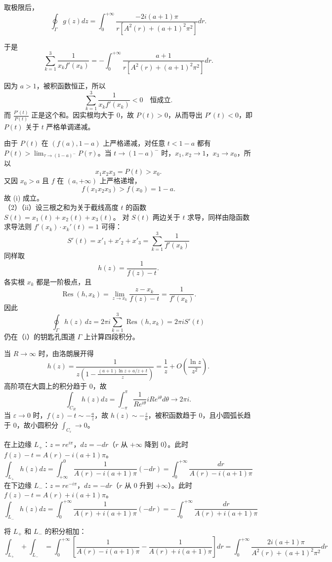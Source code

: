 \begin{solution}
取极限后，
$$\oint_\Gamma g(z)dz = \int_0^{+\infty}\frac{-2i(a+1)\pi}{r\left[A^2(r)+(a+1)^2\pi^2\right]}dr.$$

于是
$$\sum_{k=1}^3\frac{1}{x_k f'(x_k)} = -\int_0^{+\infty}\frac{a+1}{r\left[A^2(r)+(a+1)^2\pi^2\right]}dr.$$

因为 $a>1$，被积函数恒正，所以
$$\sum_{k=1}^3\frac{1}{x_k f'(x_k)} < 0 \quad \text{恒成立}.$$
而 $\frac{P'(t)}{P(t)}$ 正是这个和。因实根均大于 0，故 $P(t)>0$，从而导出 $P'(t)<0$，即 $P(t)$ 关于 $t$ 严格单调递减。

由于 $P(t)$ 在 $(f(a),1-a)$ 上严格递减，对任意 $t<1-a$ 都有 $P(t) > \lim_{\tau\to(1-a)^-}P(\tau)$。当 $t\to(1-a)^-$ 时，$x_1,x_2\to1$，$x_3\to x_0$，所以
$$x_1x_2x_3 = P(t) > x_0.$$
又因 $x_0>a$ 且 $f$ 在 $(a,+\infty)$ 上严格递增，
$$f(x_1x_2x_3) > f(x_0) = 1-a.$$
故 (i) 成立。\\
（2）（ii）设三根之和为关于截线高度 $t$ 的函数 $S(t)=x_1(t)+x_2(t)+x_3(t)$。
对 $S(t)$ 两边关于 $t$ 求导，同样由隐函数求导法则 $f'(x_k)\cdot x_k'(t)=1$ 可得：
$$S'(t)=x'_1+x'_2+x'_3=\sum_{k=1}^3\frac{1}{f'(x_k)}$$
同样取
$$ h(z)=\dfrac{1}{f(z)-t}. $$
各实根 $x_k$ 都是一阶极点，且
$$ \operatorname{Res}(h,x_k)=\lim_{z\to x_k}\frac{z-x_k}{f(z)-t}=\frac{1}{f'(x_k)}. $$
因此
$$\oint_\Gamma h(z)\,dz = 2\pi i \sum_{k=1}^3 \operatorname{Res}(h,x_k)=2\pi i S'(t)$$
仍在（i）的钥匙孔围道 $\Gamma$ 上计算四段积分。

当 $R\to\infty$ 时，由洛朗展开得
\[
h(z) = \frac{1}{z\left(1 - \frac{(a+1)\ln z + a/z + t}{z}\right)} = \frac{1}{z} + O\left(\frac{\ln z}{z^2}\right).
\]
高阶项在大圆上的积分趋于 0，故
\[
\int_{C_R} h(z)dz = \int_{-\pi}^{\pi} \frac{1}{R e^{i\theta}} i R e^{i\theta} d\theta \to 2\pi i.
\]
当 $\varepsilon\to0$ 时，$f(z)-t\sim -\frac{a}{z}$，故 $h(z)\sim -\frac{z}{a}$，被积函数趋于 0，且小圆弧长趋于 0，故小圆积分 $\int_{C_\varepsilon}\to0$。

在上边缘 $L_+$：$z=r e^{i\pi}$，$dz=-dr$（$r$ 从 $+\infty$ 降到 $0$）。此时 $f(z)-t=A(r)-i(a+1)\pi$。
$$\int_{L_+}h(z)dz = \int_{+\infty}^0 \frac{1}{A(r)-i(a+1)\pi} (-dr) = \int_0^{+\infty} \frac{dr}{A(r)-i(a+1)\pi}$$
在下边缘 $L_-$：$z=r e^{-i\pi}$，$dz=-dr$（$r$ 从 $0$ 升到 $+\infty$）。此时 $f(z)-t=A(r)+i(a+1)\pi$。
$$\int_{L_-}h(z)dz = \int_{0}^{+\infty} \frac{1}{A(r)+i(a+1)\pi} (-dr) = -\int_0^{+\infty} \frac{dr}{A(r)+i(a+1)\pi}$$

将 $L_+$ 和 $L_-$ 的积分相加：
$$\int_{L_+}+\int_{L_-} = \int_0^{+\infty}\left[\frac{1}{A(r)-i(a+1)\pi} - \frac{1}{A(r)+i(a+1)\pi}\right]dr = \int_0^{+\infty}\frac{2i(a+1)\pi}{A^2(r)+(a+1)^2\pi^2}dr$$


\end{solution}
